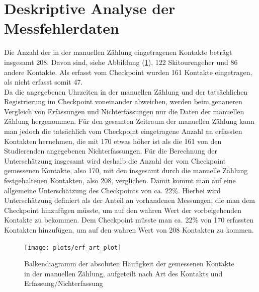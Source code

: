 \documentclass[12pt]{scrreprt}
\begin{document}
\section{Deskriptive Analyse der Messfehlerdaten}
Die Anzahl der in der manuellen Zählung eingetragenen Kontakte beträgt insgesamt 208. Davon sind, siehe Abbildung (\ref{pic:erf_art_plot}),  122 Skitourengeher und 86 andere Kontakte. Als erfasst vom Checkpoint wurden 161 Kontakte eingetragen, als nicht erfasst somit 47. \\
Da die angegebenen Uhrzeiten in der manuellen Zählung und der tatsächlichen Registrierung im Checkpoint voneinander abweichen, werden beim genaueren Vergleich von Erfassungen und Nichterfassungen nur die Daten der manuellen Zählung hergenommen. Für den gesamten Zeitraum der manuellen Zählung kann man jedoch die tatsächlich vom Checkpoint eingetragene Anzahl an erfassten Kontakten hernehmen, die mit 170 etwas höher ist als die 161 von den Studierenden angegebenen Nichterfassungen. Für die Berechnung der Unterschätzung insgesamt wird deshalb die Anzahl der vom Checkpoint gemessenen Kontakte, also 170, mit den insgesamt durch die manuelle Zählung festgehaltenen Kontakten, also 208, verglichen. Damit kommt man auf eine allgemeine Unterschätzung des Checkpoints von ca. 22\%. Hierbei wird \glqq Unterschätzung \grqq definiert als der Anteil an vorhandenen Messungen, die man dem Checkpoint hinzufügen müsste, um auf den wahren Wert der vorbeigehenden Kontakte zu bekommen. Dem Checkpoint müsste man ca. 22\% von 170 erfassten Kontakten hinzufügen, um auf den wahren Wert von 208 Kontakten zu kommen. \\
\begin{figure}[H]
	\centering
	\texttt{[image: plots/erf\_art\_plot]}
	\caption{Balkendiagramm der absoluten Häufigkeit der gemessenen Kontakte in der manuellen Zählung, aufgeteilt nach Art des Kontakts und Erfassung/Nichterfassung}
	\label{pic:erf_art_plot}	
\end{figure}
\end{document}
